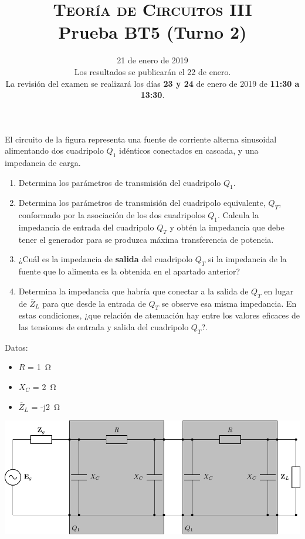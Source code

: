 \documentclass[12pt]{article}
\begin{document}
\title{\textsc{Teoría de Circuitos III}\\Prueba BT5 (Turno 2)}

\date{21 de enero de  2019\\\small{Los resultados se publicarán el 22 de enero.\\La revisión del examen se realizará los días \textbf{23 y 24} de enero de 2019 de \textbf{11:30 a 13:30}.}}

\maketitle

El circuito de la figura representa una fuente de corriente alterna sinusoidal alimentando dos cuadripolo $Q_1$ idénticos conectados en cascada, y una impedancia de carga. 
\begin{enumerate}

\item Determina los parámetros de transmisión del cuadripolo $Q_1$.

\item Determina los parámetros de transmisión del cuadripolo equivalente, $Q_T$, conformado por la asociación de los dos cuadripolos $Q_1$. Calcula la impedancia de entrada del cuadripolo $Q_T$ y obtén la impedancia que debe tener el generador para se produzca máxima transferencia de potencia.

\item ¿Cuál es la impedancia de \textbf{salida} del cuadripolo $Q_T$ si la impedancia de la fuente que lo alimenta es la obtenida en el apartado anterior?

\item Determina la impedancia que habría que conectar a la salida de $Q_T$ en lugar de $\overline{Z}_L$ para que desde la entrada de $Q_T$ se observe esa misma impedancia. En estas condiciones, ¿que relación de atenuación hay entre los valores eficaces de las tensiones de entrada y salida del cuadripolo $Q_T$?.

\end{enumerate}


\begin{minipage}{0.2\textwidth}
  Datos:
  \begin{itemize}
  \item $R$ = \SI{1}{\ohm}
  \item $X_C$ = \SI{2}{\ohm}
  \item $\overline{Z}_L$ = -j\SI{2}{\ohm}
  \end{itemize}
\end{minipage}
\begin{minipage}{0.8\textwidth}
\includegraphics[scale=0.85]{figs/E5_circuito2.pdf}
\end{minipage}
\end{document}
